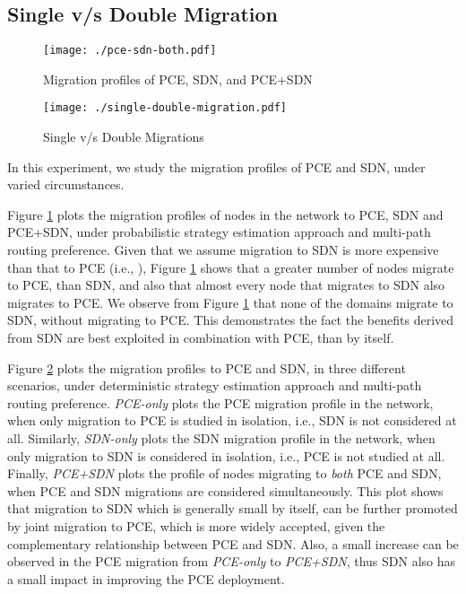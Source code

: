 \documentclass[smallextended]{svjour3}
\begin{document}
\subsection{Single v/s Double Migration}

\begin{figure}
\begin{center}
\texttt{[image: ./pce-sdn-both.pdf]}
\caption{Migration profiles of PCE, SDN, and PCE+SDN}
\label{fig:pce-sdn-both}
\end{center}
\end{figure}

\begin{figure}
\begin{center}
\texttt{[image: ./single-double-migration.pdf]}
\caption{Single v/s Double Migrations}
\label{fig:single v/s double migrations}
\end{center}
\end{figure}

\par In this experiment, we study the migration profiles of PCE and SDN, under
varied circumstances.

\par Figure \ref{fig:pce-sdn-both} plots the migration profiles of nodes in the
network to PCE, SDN and PCE+SDN, under probabilistic strategy estimation
approach and multi-path routing preference. Given that we assume migration to
SDN is more expensive than that to PCE (i.e., ),
Figure \ref{fig:pce-sdn-both} shows that a greater number of nodes migrate to PCE, than SDN, and also that almost every
node that migrates to SDN also migrates to PCE. We observe from Figure
\ref{fig:pce-sdn-both} that none of the domains migrate to SDN, without
migrating to PCE. This demonstrates the fact the benefits derived from SDN are
best exploited in combination with PCE, than by itself.

\par Figure \ref{fig:single v/s double migrations} plots the migration profiles
to PCE and SDN, in three different scenarios, under deterministic strategy
estimation approach and multi-path routing preference.
\emph{PCE-only} plots the PCE migration profile in the network, when only migration to PCE is studied in
isolation, i.e.,  SDN is not considered at all. Similarly, \emph{SDN-only} plots
the SDN migration profile in the network, when only migration to SDN is considered in
isolation, i.e.,  PCE is not studied at all. Finally, \emph{PCE+SDN} plots the
profile of nodes migrating to \emph{both} PCE and SDN, when PCE and SDN
migrations are considered simultaneously. This plot shows that migration to SDN
which is generally small by itself, can be further promoted by joint migration
to PCE, which is more widely accepted, given the complementary relationship
between PCE and SDN. Also, a small increase can be
observed in the PCE migration from \emph{PCE-only} to \emph{PCE+SDN}, thus SDN also has a
small impact in improving the PCE deployment.
\end{document}
